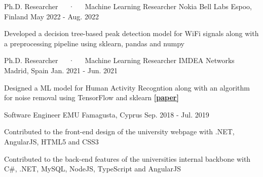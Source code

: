 \begin{cventries}
  \cventry
    {Ph.D. Researcher~~~·~~~Machine Learning Researcher} %
    {Nokia Bell Labs} %
    {Espoo, Finland} %
    {May  2022 - Aug. 2022} %
    {
      \begin{cvitems} %
        \item {Developed a decision tree-based peak detection model for WiFi signals along with a preprocessing pipeline using sklearn, pandas and numpy}
      \end{cvitems}
    }

  \cventry
    {Ph.D. Researcher~~~·~~~Machine Learning Researcher} %
    {IMDEA Networks} %
    {Madrid, Spain} %
    {Jan. 2021 - Jun. 2021} %
    {
      \begin{cvitems} %
        \item {Designed a ML model for Human Activity Recogntion along with an algorithm for noise removal using TensorFlow and sklearn \href{https://ieeexplore.ieee.org/abstract/document/10172159/}{\textbf{[paper]}}}
      \end{cvitems}
    }

  \cventry
    {Software Engineer} %
    {EMU} %
    {Famagusta, Cyprus} %
    {Sep. 2018 - Jul. 2019} %
    {
      \begin{cvitems} %
        \item {Contributed to the front-end design of the university webpage with .NET, AngularJS, HTML5 and CSS3}
        \item {Contributed to the back-end features of the universities internal backbone with C\#, .NET, MySQL, NodeJS, TypeScript and AngularJS}
      \end{cvitems}
    }


\end{cventries}
